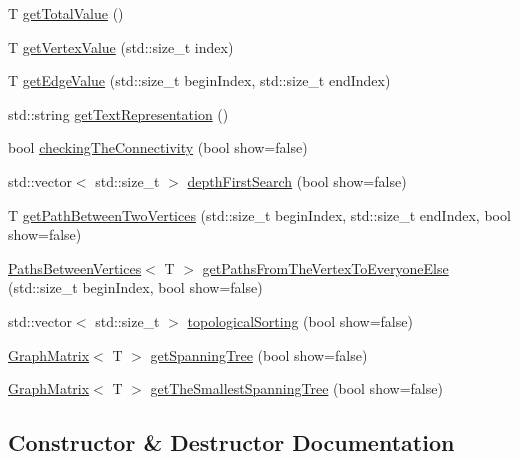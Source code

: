 \begin{DoxyCompactItemize}
\item 
T \mbox{\hyperlink{classgm_1_1_graph_matrix_a2dd4beb317ef1742df02eee6581c1194}{get\+Total\+Value}} ()
\item 
T \mbox{\hyperlink{classgm_1_1_graph_matrix_adacccfacb1c46e0fa0ca173846f48a11}{get\+Vertex\+Value}} (std\+::size\+\_\+t index)
\item 
T \mbox{\hyperlink{classgm_1_1_graph_matrix_a57fbb70b98bfdd89400afaaac7af20ec}{get\+Edge\+Value}} (std\+::size\+\_\+t begin\+Index, std\+::size\+\_\+t end\+Index)
\item 
std\+::string \mbox{\hyperlink{classgm_1_1_graph_matrix_a58ac0e38794e668383319945b3c59f08}{get\+Text\+Representation}} ()
\item 
bool \mbox{\hyperlink{classgm_1_1_graph_matrix_ab91a8713c4e8ed19bedc58f1cfab2bc5}{checking\+The\+Connectivity}} (bool show=false)
\item 
std\+::vector$<$ std\+::size\+\_\+t $>$ \mbox{\hyperlink{classgm_1_1_graph_matrix_a91506a78cf2efe32f6c48a7f12914a43}{depth\+First\+Search}} (bool show=false)
\item 
T \mbox{\hyperlink{classgm_1_1_graph_matrix_aff0a3d3adbdcc6bce105e8c10f422a4b}{get\+Path\+Between\+Two\+Vertices}} (std\+::size\+\_\+t begin\+Index, std\+::size\+\_\+t end\+Index, bool show=false)
\item 
\mbox{\hyperlink{structpbv_1_1_paths_between_vertices}{Paths\+Between\+Vertices}}$<$ T $>$ \mbox{\hyperlink{classgm_1_1_graph_matrix_a2eb3d434634993733dfd8fb7515ca8b9}{get\+Paths\+From\+The\+Vertex\+To\+Everyone\+Else}} (std\+::size\+\_\+t begin\+Index, bool show=false)
\item 
std\+::vector$<$ std\+::size\+\_\+t $>$ \mbox{\hyperlink{classgm_1_1_graph_matrix_a8f88b6ebce9cc1ed403d414cd173da02}{topological\+Sorting}} (bool show=false)
\item 
\mbox{\hyperlink{classgm_1_1_graph_matrix}{Graph\+Matrix}}$<$ T $>$ \mbox{\hyperlink{classgm_1_1_graph_matrix_a490a9ef8eb86acc75c42a97cf5dbb368}{get\+Spanning\+Tree}} (bool show=false)
\item 
\mbox{\hyperlink{classgm_1_1_graph_matrix}{Graph\+Matrix}}$<$ T $>$ \mbox{\hyperlink{classgm_1_1_graph_matrix_a8e60714a5f3b6fae8c04be67bbf8b56c}{get\+The\+Smallest\+Spanning\+Tree}} (bool show=false)
\end{DoxyCompactItemize}


\subsection{Constructor \& Destructor Documentation}
\mbox{\label{classgm_1_1_graph_matrix_a8f4f156e67d7425f1cc5784384a83757}} 
